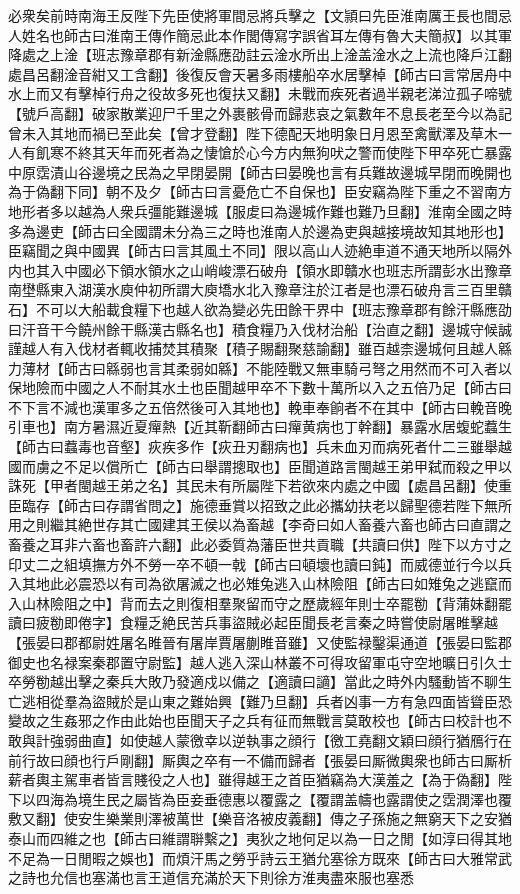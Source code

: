 必衆矣前時南海王反陛下先臣使將軍間忌將兵擊之【文頴曰先臣淮南厲王長也間忌人姓名也師古曰淮南王傳作簡忌此本作閭傳寫字誤省耳左傳有魯大夫簡叔】以其軍降處之上淦【班志豫章郡有新淦縣應劭註云淦水所出上淦盖淦水之上流也降戶江翻處昌呂翻淦音紺又工含翻】後復反會天暑多雨樓船卒水居擊棹【師古曰言常居舟中水上而又有擊棹行舟之役故多死也復扶又翻】未戰而疾死者過半親老涕泣孤子啼號【號戶高翻】破家散業迎尸千里之外裹骸骨而歸悲哀之氣數年不息長老至今以為記曾未入其地而禍已至此矣【曾才登翻】陛下德配天地明象日月恩至禽獸澤及草木一人有飢寒不終其天年而死者為之悽愴於心今方内無狗吠之警而使陛下甲卒死亡暴露中原霑漬山谷邊境之民為之早閉晏開【師古曰晏晚也言有兵難故邊城早閉而晚開也為于偽翻下同】朝不及夕【師古曰言憂危亡不自保也】臣安竊為陛下重之不習南方地形者多以越為人衆兵彊能難邊城【服䖍曰為邊城作難也難乃旦翻】淮南全國之時多為邊吏【師古曰全國謂未分為三之時也淮南人於邊為吏與越接境故知其地形也】臣竊聞之與中國異【師古曰言其風土不同】限以高山人迹絶車道不通天地所以隔外内也其入中國必下領水領水之山峭峻漂石破舟【領水即贛水也班志所謂彭水出豫章南壄縣東入湖漢水庾仲初所謂大庾墧水北入豫章注於江者是也漂石破舟言三百里贛石】不可以大船載食糧下也越人欲為變必先田餘干界中【班志豫章郡有餘汗縣應劭曰汗音干今饒州餘干縣漢古縣名也】積食糧乃入伐材治船【治直之翻】邊城守候誠謹越人有入伐材者輒收捕焚其積聚【積子賜翻聚慈諭翻】雖百越柰邊城何且越人緜力薄材【師古曰緜弱也言其柔弱如緜】不能陸戰又無車騎弓弩之用然而不可入者以保地險而中國之人不耐其水土也臣聞越甲卒不下數十萬所以入之五倍乃足【師古曰不下言不減也漢軍多之五倍然後可入其地也】輓車奉餉者不在其中【師古曰輓音晚引車也】南方暑濕近夏癉熱【近其靳翻師古曰癉黄病也丁幹翻】暴露水居蝮蛇蠚生【師古曰蠚毒也音壑】疢疾多作【疢丑刃翻病也】兵未血刃而病死者什二三雖舉越國而虜之不足以償所亡【師古曰舉謂摠取也】臣聞道路言閩越王弟甲弑而殺之甲以誅死【甲者閩越王弟之名】其民未有所屬陛下若欲來内處之中國【處昌呂翻】使重臣臨存【師古曰存謂省問之】施德垂賞以招致之此必攜幼扶老以歸聖德若陛下無所用之則繼其絶世存其亡國建其王侯以為畜越【李奇曰如人畜養六畜也師古曰直謂之畜養之耳非六畜也畜許六翻】此必委質為藩臣世共貢職【共讀曰供】陛下以方寸之印丈二之組填撫方外不勞一卒不頓一戟【師古曰頓壞也讀曰鈍】而威德並行今以兵入其地此必震恐以有司為欲屠滅之也必雉兔逃入山林險阻【師古曰如雉兔之逃竄而入山林險阻之中】背而去之則復相羣聚留而守之歷歲經年則士卒罷勌【背蒲妹翻罷讀曰疲勌即倦字】食糧乏絶民苦兵事盜賊必起臣聞長老言秦之時嘗使尉屠睢擊越【張晏曰郡都尉姓屠名睢晉有屠岸賈屠蒯睢音雖】又使監禄鑿渠通道【張晏曰監郡御史也名禄案秦郡置守尉監】越人逃入深山林叢不可得攻留軍屯守空地曠日引久士卒勞勌越出擊之秦兵大敗乃發適戍以備之【適讀曰讁】當此之時外内騷動皆不聊生亡逃相從羣為盜賊於是山東之難始興【難乃旦翻】兵者凶事一方有急四面皆聳臣恐變故之生姦邪之作由此始也臣聞天子之兵有征而無戰言莫敢校也【師古曰校計也不敢與計強弱曲直】如使越人蒙徼幸以逆執事之顔行【徼工堯翻文穎曰顔行猶鴈行在前行故曰顔也行戶剛翻】厮輿之卒有一不備而歸者【張晏曰厮微輿衆也師古曰厮析薪者輿主駕車者皆言賤役之人也】雖得越王之首臣猶竊為大漢羞之【為于偽翻】陛下以四海為境生民之屬皆為臣妾垂德惠以覆露之【覆謂盖幬也露謂使之霑潤澤也覆敷又翻】使安生樂業則澤被萬世【樂音洛被皮義翻】傳之子孫施之無窮天下之安猶泰山而四維之也【師古曰維謂聨繫之】夷狄之地何足以為一日之閒【如淳曰得其地不足為一日閒暇之娛也】而煩汗馬之勞乎詩云王猶允塞徐方既來【師古曰大雅常武之詩也允信也塞滿也言王道信充滿於天下則徐方淮夷盡來服也塞悉